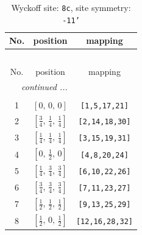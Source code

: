 \documentclass[fleqn,8pt]{jsarticle}
\begin{document}
\renewcommand{\arraystretch}{1.2}
\begin{longtable}{ccc}
\caption{Wyckoff site: {\tt 8c}, site symmetry: {\tt -11'}}
 \\
 \hline \hline
No. & position & mapping \\ \hline \endfirsthead

\multicolumn{2}{l}{\tablename\ \thetable{}} \\
 \hline \hline
No. & position & mapping \\ \hline \endhead

 \hline \hline
\multicolumn{2}{r}{\footnotesize\it continued ...} \\ \endfoot

 \hline \hline
\multicolumn{2}{r}{} \\ \endlastfoot

1 & $\left[ 0,\, 0,\, 0 \right]$ & {\tt [1,5,17,21]} \\ \hline
2 & $\left[ \frac{3}{4},\, \frac{1}{4},\, \frac{1}{4} \right]$ & {\tt [2,14,18,30]} \\ \hline
3 & $\left[ \frac{1}{4},\, \frac{1}{4},\, \frac{1}{4} \right]$ & {\tt [3,15,19,31]} \\ \hline
4 & $\left[ 0,\, \frac{1}{2},\, 0 \right]$ & {\tt [4,8,20,24]} \\ \hline
5 & $\left[ \frac{1}{4},\, \frac{3}{4},\, \frac{3}{4} \right]$ & {\tt [6,10,22,26]} \\ \hline
6 & $\left[ \frac{3}{4},\, \frac{3}{4},\, \frac{3}{4} \right]$ & {\tt [7,11,23,27]} \\ \hline
7 & $\left[ \frac{1}{2},\, \frac{1}{2},\, \frac{1}{2} \right]$ & {\tt [9,13,25,29]} \\ \hline
8 & $\left[ \frac{1}{2},\, 0,\, \frac{1}{2} \right]$ & {\tt [12,16,28,32]} \\
\end{longtable}
\renewcommand{\arraystretch}{1.2}
\end{document}
